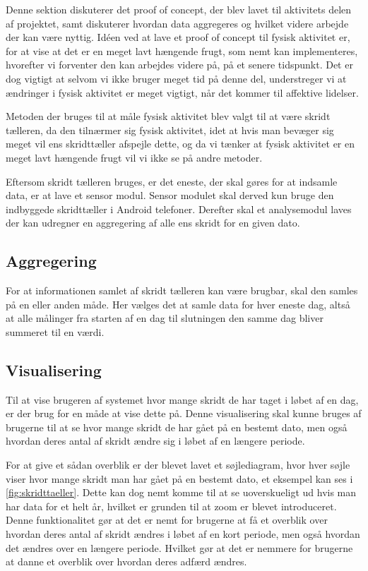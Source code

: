 Denne sektion diskuterer det proof of concept, der blev lavet til aktivitets delen af projektet, samt diskuterer hvordan data aggregeres og hvilket videre arbejde der kan være nyttig. 
Idéen ved at lave et proof of concept til fysisk aktivitet er, for at vise at det er en meget lavt hængende frugt, som nemt kan implementeres, hvorefter vi forventer den kan arbejdes videre på, på et senere tidspunkt. 
Det er dog vigtigt at selvom vi ikke bruger meget tid på denne del, understreger vi at ændringer i fysisk aktivitet er meget vigtigt, når det kommer til affektive lidelser. 

Metoden der bruges til at måle fysisk aktivitet blev valgt til at være skridt tælleren, da den tilnærmer sig fysisk aktivitet, idet at hvis man bevæger sig meget vil ens skridttæller afspejle dette, og da vi tænker at fysisk aktivitet er en meget lavt hængende frugt vil vi ikke se på andre metoder.

Eftersom skridt tælleren bruges, er det eneste, der skal gøres for at indsamle data, er at lave et sensor modul.
Sensor modulet skal derved kun bruge den indbyggede skridttæller i Android telefoner.
Derefter skal et analysemodul laves der kan udregner en aggregering af alle ens skridt for en given dato.

\subsection{Aggregering}
For at informationen samlet af skridt tælleren kan være brugbar, skal den samles på en eller anden måde.
Her vælges det at samle data for hver eneste dag, altså at alle målinger fra starten af en dag til slutningen den samme dag bliver summeret til en værdi.

\subsection{Visualisering}\label{sec:aktivitetVis}
Til at vise brugeren af systemet hvor mange skridt de har taget i løbet af en dag, er der brug for en måde at vise dette på.
Denne visualisering skal kunne bruges af brugerne til at se hvor mange skridt de har gået på en bestemt dato, men også hvordan deres antal af skridt ændre sig i løbet af en længere periode.

For at give et sådan overblik er der blevet lavet et søjlediagram, hvor hver søjle viser hvor mange skridt man har gået på en bestemt dato, et eksempel kan ses i \cref{fig:skridttaeller}.
Dette kan dog nemt komme til at se uoverskueligt ud hvis man har data for et helt år, hvilket er grunden til at zoom er blevet introduceret.
Denne funktionalitet gør at det er nemt for brugerne at få et overblik over hvordan deres antal af skridt ændres i løbet af en kort periode, men også hvordan det ændres over en længere periode.
Hvilket gør at det er nemmere for brugerne at danne et overblik over hvordan deres adfærd ændres.

